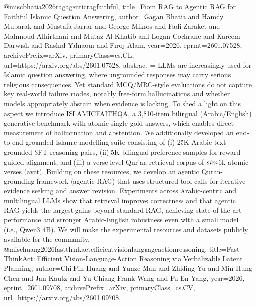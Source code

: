 {}@misc{bhatia2026ragagenticragfaithful,
      title={From RAG to Agentic RAG for Faithful Islamic Question Answering}, 
      author={Gagan Bhatia and Hamdy Mubarak and Mustafa Jarrar and George Mikros and Fadi Zaraket and Mahmoud Alhirthani and Mutaz Al-Khatib and Logan Cochrane and Kareem Darwish and Rashid Yahiaoui and Firoj Alam},
      year={2026},
      eprint={2601.07528},
      archivePrefix={arXiv},
      primaryClass={cs.CL},
      url={https://arxiv.org/abs/2601.07528},
      abstract = {LLMs are increasingly used for Islamic question answering, where ungrounded responses may carry serious religious consequences. Yet standard MCQ/MRC-style evaluations do not capture key real-world failure modes, notably free-form hallucinations and whether models appropriately abstain when evidence is lacking. To shed a light on this aspect we introduce ISLAMICFAITHQA, a 3,810-item bilingual (Arabic/English) generative benchmark with atomic single-gold answers, which enables direct measurement of hallucination and abstention. We additionally developed an end-to-end grounded Islamic modelling suite consisting of (i) 25K Arabic text-grounded SFT reasoning pairs, (ii) 5K bilingual preference samples for reward-guided alignment, and (iii) a verse-level Qur'an retrieval corpus of $\\sim$6k atomic verses (ayat). Building on these resources, we develop an agentic Quran-grounding framework (agentic RAG) that uses structured tool calls for iterative evidence seeking and answer revision. Experiments across Arabic-centric and multilingual LLMs show that retrieval improves correctness and that agentic RAG yields the largest gains beyond standard RAG, achieving state-of-the-art performance and stronger Arabic-English robustness even with a small model (i.e., Qwen3 4B). We will make the experimental resources and datasets publicly available for the community.}
}@misc{huang2026fastthinkactefficientvisionlanguageactionreasoning,
      title={Fast-ThinkAct: Efficient Vision-Language-Action Reasoning via Verbalizable Latent Planning}, 
      author={Chi-Pin Huang and Yunze Man and Zhiding Yu and Min-Hung Chen and Jan Kautz and Yu-Chiang Frank Wang and Fu-En Yang},
      year={2026},
      eprint={2601.09708},
      archivePrefix={arXiv},
      primaryClass={cs.CV},
      url={https://arxiv.org/abs/2601.09708},
}
